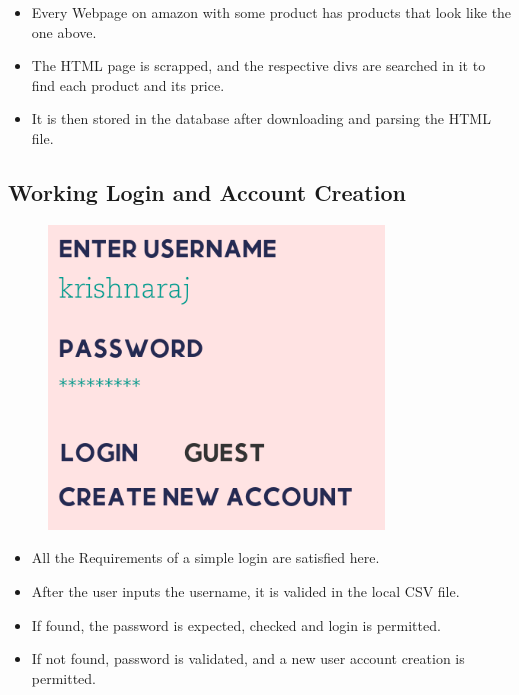 \documentclass[11pt]{article}
\begin{document}
\begin{itemize}
	\item Every Webpage on amazon with some product has products that look like the one above.
	\item The HTML page is scrapped, and the respective divs are searched in it to find each product and its price. 
	\item It is then stored in the database after downloading and parsing the HTML file. 
\end{itemize}

\subsection{Working Login and Account Creation}
\begin{figure}[H]
\centering
\includegraphics[scale=0.6]{login.png}
\caption{}
\end{figure}

\begin{itemize}
	\item All the Requirements of a simple login are satisfied here. 
	\item After the user inputs the username, it is valided in the local CSV file. 
	\item If found, the password is expected, checked and login is permitted. 
	\item If not found, password is validated, and a new user account creation is permitted. 
\end{itemize}
\end{document}
